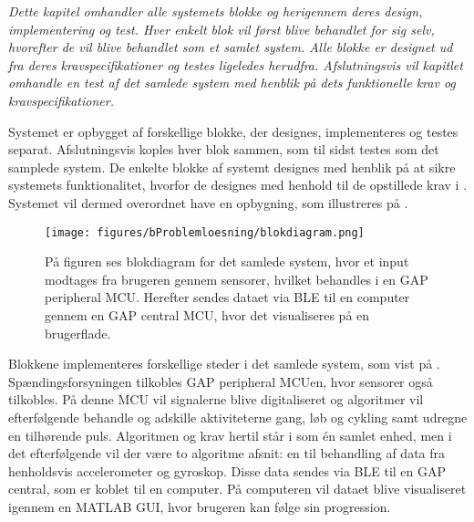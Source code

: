 \textit{Dette kapitel omhandler alle systemets blokke og herigennem deres design, implementering og test. Hver enkelt blok vil først blive behandlet for sig selv, hvorefter de vil blive behandlet som et samlet system. Alle blokke er designet ud fra deres kravspecifikationer og testes ligeledes herudfra. Afslutningsvis vil kapitlet omhandle en test af det samlede system med henblik på dets funktionelle krav og kravspecifikationer.}

Systemet er opbygget af forskellige blokke, der designes, implementeres og testes separat. Afslutningsvis koples hver blok sammen, som til sidst testes som det samplede system. De enkelte blokke af systemt designes med henblik på at sikre systemets funktionalitet, hvorfor de designes med henhold til de opstillede krav i . Systemet vil dermed overordnet have en opbygning, som illustreres på .
\begin{figure}[H]
	\centering
	\texttt{[image: figures/bProblemloesning/blokdiagram.png]}
	\caption{På figuren ses blokdiagram for det samlede system, hvor et input modtages fra brugeren gennem sensorer, hvilket behandles i en GAP peripheral MCU. Herefter sendes dataet via BLE til en computer gennem en GAP central MCU, hvor det visualiseres på en brugerflade.}
	\label{fig:design_blokdiagram}
\end{figure}
Blokkene implementeres forskellige steder i det samlede system, som vist på . Spændingsforsyningen tilkobles GAP peripheral MCUen, hvor sensorer også tilkobles. På denne MCU vil signalerne blive digitaliseret og algoritmer vil efterfølgende behandle og adskille aktiviteterne gang, løb og cykling samt udregne en tilhørende puls. Algoritmen og krav hertil står i  som én samlet enhed, men i det efterfølgende vil der være to algoritme afsnit: en til behandling af data fra henholdsvis accelerometer og gyroskop. Disse data sendes via BLE til en GAP central, som er koblet til en computer. På computeren vil dataet blive visualiseret igennem en MATLAB GUI, hvor brugeren kan følge sin progression.